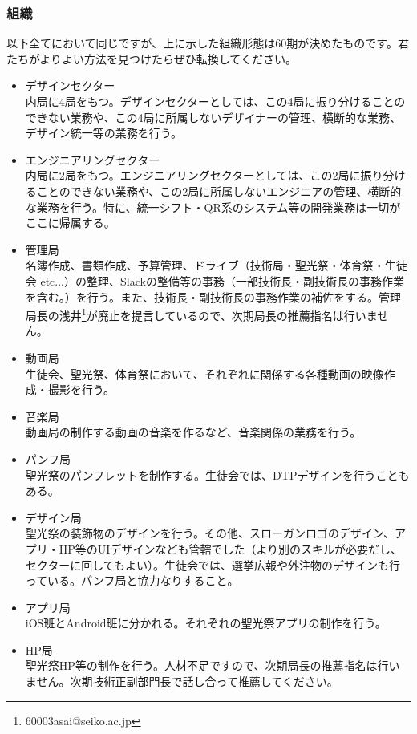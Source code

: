 \documentclass[dvipdfmx,jb5]{jarticle}
\begin{document}
\subsubsection{組織}
以下全てにおいて同じですが、上に示した組織形態は60期が決めたものです。君たちがよりよい方法を見つけたらぜひ転換してください。
\begin{itemize}
  \item デザインセクター\\
  内局に4局をもつ。デザインセクターとしては、この4局に振り分けることのできない業務や、この4局に所属しないデザイナーの管理、横断的な業務、デザイン統一等の業務を行う。
  \item エンジニアリングセクター\\
  内局に2局をもつ。エンジニアリングセクターとしては、この2局に振り分けることのできない業務や、この2局に所属しないエンジニアの管理、横断的な業務を行う。特に、統一シフト・QR系のシステム等の開発業務は一切がここに帰属する。
  \item 管理局\\
  名簿作成、書類作成、予算管理、ドライブ（技術局・聖光祭・体育祭・生徒会 etc...）の整理、Slackの整備等の事務（一部技術長・副技術長の事務作業を含む。）を行う。また、技術長・副技術長の事務作業の補佐をする。管理局長の浅井\footnote{60003asai@seiko.ac.jp}が廃止を提言しているので、次期局長の推薦指名は行いません。
  \item 動画局\\
  生徒会、聖光祭、体育祭において、それぞれに関係する各種動画の映像作成・撮影を行う。
  \item 音楽局\\
  動画局の制作する動画の音楽を作るなど、音楽関係の業務を行う。
  \item パンフ局\\
  聖光祭のパンフレットを制作する。生徒会では、DTPデザインを行うこともある。
  \item デザイン局\\
  聖光祭の装飾物のデザインを行う。その他、スローガンロゴのデザイン、アプリ・HP等のUIデザインなども管轄でした（より別のスキルが必要だし、セクターに回してもよい）。生徒会では、選挙広報や外注物のデザインも行っている。パンフ局と協力なりすること。
  \item アプリ局\\
  iOS班とAndroid班に分かれる。それぞれの聖光祭アプリの制作を行う。
  \item HP局\\
  聖光祭HP等の制作を行う。人材不足ですので、次期局長の推薦指名は行いません。次期技術正副部門長で話し合って推薦してください。
\end{itemize}
\end{document}
